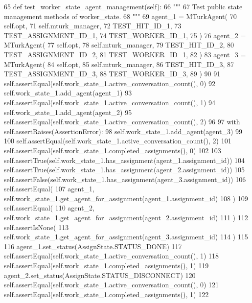 \begin{DoxyCode}
65     \textcolor{keyword}{def }test\_worker\_state\_agent\_management(self):
66         \textcolor{stringliteral}{"""}
67 \textcolor{stringliteral}{        Test public state management methods of worker\_state.}
68 \textcolor{stringliteral}{        """}
69         agent\_1 = MTurkAgent(
70             self.opt,
71             self.mturk\_manager,
72             TEST\_HIT\_ID\_1,
73             TEST\_ASSIGNMENT\_ID\_1,
74             TEST\_WORKER\_ID\_1,
75         )
76         agent\_2 = MTurkAgent(
77             self.opt,
78             self.mturk\_manager,
79             TEST\_HIT\_ID\_2,
80             TEST\_ASSIGNMENT\_ID\_2,
81             TEST\_WORKER\_ID\_1,
82         )
83         agent\_3 = MTurkAgent(
84             self.opt,
85             self.mturk\_manager,
86             TEST\_HIT\_ID\_3,
87             TEST\_ASSIGNMENT\_ID\_3,
88             TEST\_WORKER\_ID\_3,
89         )
90 
91         self.assertEqual(self.work\_state\_1.active\_conversation\_count(), 0)
92         self.work\_state\_1.add\_agent(agent\_1)
93         self.assertEqual(self.work\_state\_1.active\_conversation\_count(), 1)
94         self.work\_state\_1.add\_agent(agent\_2)
95         self.assertEqual(self.work\_state\_1.active\_conversation\_count(), 2)
96 
97         with self.assertRaises(AssertionError):
98             self.work\_state\_1.add\_agent(agent\_3)
99 
100         self.assertEqual(self.work\_state\_1.active\_conversation\_count(), 2)
101         self.assertEqual(self.work\_state\_1.completed\_assignments(), 0)
102 
103         self.assertTrue(self.work\_state\_1.has\_assignment(agent\_1.assignment\_id))
104         self.assertTrue(self.work\_state\_1.has\_assignment(agent\_2.assignment\_id))
105         self.assertFalse(self.work\_state\_1.has\_assignment(agent\_3.assignment\_id))
106         self.assertEqual(
107             agent\_1, self.work\_state\_1.get\_agent\_for\_assignment(agent\_1.assignment\_id)
108         )
109         self.assertEqual(
110             agent\_2, self.work\_state\_1.get\_agent\_for\_assignment(agent\_2.assignment\_id)
111         )
112         self.assertIsNone(
113             self.work\_state\_1.get\_agent\_for\_assignment(agent\_3.assignment\_id)
114         )
115 
116         agent\_1.set\_status(AssignState.STATUS\_DONE)
117         self.assertEqual(self.work\_state\_1.active\_conversation\_count(), 1)
118         self.assertEqual(self.work\_state\_1.completed\_assignments(), 1)
119         agent\_2.set\_status(AssignState.STATUS\_DISCONNECT)
120         self.assertEqual(self.work\_state\_1.active\_conversation\_count(), 0)
121         self.assertEqual(self.work\_state\_1.completed\_assignments(), 1)
122 
\end{DoxyCode}
